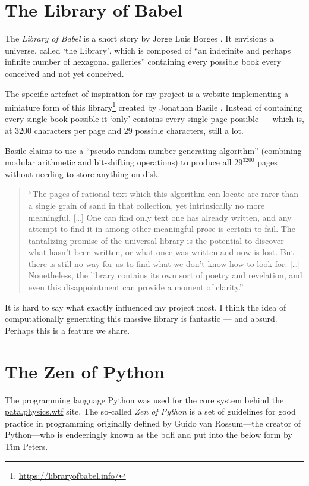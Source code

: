 \section{The Library of Babel}

The \textit{Library of Babel} is a short story by Jorge Luis Borges \autocite{Borges1964}. It envisions a universe, called `the Library', which is composed of ``an indefinite and perhaps infinite number of hexagonal galleries'' containing every possible book every conceived and not yet conceived.

The specific artefact of inspiration for my project is a website implementing a miniature form of this library\footnote{\url{https://libraryofbabel.info/}} created by Jonathan Basile \autocite{Basile2015}. Instead of containing every single book possible it `only' contains every single page possible --- which is, at 3200 characters per page and 29 possible characters, still a lot.

Basile claims to use a ``pseudo-random number generating algorithm'' (combining modular arithmetic and bit-shifting operations) to produce all $29^{3200}$ pages without needing to store anything on disk.

\begin{quotation}
  ``The pages of rational text which this algorithm can locate are rarer than a single grain of sand in that collection, yet intrinsically no more meaningful.
  [\ldots]
  One can find only text one has already written, and any attempt to find it in among other meaningful prose is certain to fail. The tantalizing promise of the universal library is the potential to discover what hasn’t been written, or what once was written and now is lost. But there is still no way for us to find what we don’t know how to look for.
  [\ldots]
  Nonetheless, the library contains its own sort of poetry and revelation, and even this disappointment can provide a moment of clarity.'' 
\end{quotation}

It is hard to say what exactly influenced my project most. I think the idea of computationally generating this massive library is fantastic --- and absurd. Perhaps this is a feature we share.


\section{The Zen of Python}

The programming language Python was used for the core system behind the \url{pata.physics.wtf} site. The so-called \textit{Zen of Python} is a set of guidelines for good practice in programming originally defined by Guido van Rossum---the creator of Python---who is endeeringly known as the \gls{bdfl} and put into the below form by Tim Peters.

